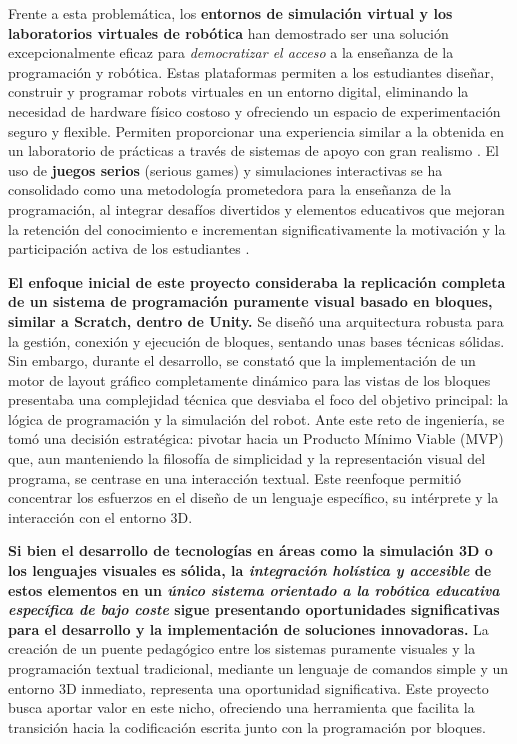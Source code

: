 Frente a esta problemática, los \textbf{entornos de simulación virtual y los laboratorios virtuales de robótica} han demostrado ser una solución excepcionalmente eficaz para \textit{democratizar el acceso} a la enseñanza de la programación y robótica. Estas plataformas permiten a los estudiantes diseñar, construir y programar robots virtuales en un entorno digital, eliminando la necesidad de hardware físico costoso y ofreciendo un espacio de experimentación seguro y flexible. Permiten proporcionar una experiencia similar a la obtenida en un laboratorio de prácticas a través de sistemas de apoyo con gran realismo \cite{Simulador3DUnity}. El uso de \textbf{juegos serios} (serious games) y simulaciones interactivas se ha consolidado como una metodología prometedora para la enseñanza de la programación, al integrar desafíos divertidos y elementos educativos que mejoran la retención del conocimiento e incrementan significativamente la motivación y la participación activa de los estudiantes \cite{GeoBotsVR}.

 \textbf{El enfoque inicial de este proyecto consideraba la replicación completa de un sistema de programación puramente visual basado en bloques, similar a Scratch, dentro de Unity.} Se diseñó una arquitectura robusta para la gestión, conexión y ejecución de bloques, sentando unas bases técnicas sólidas. Sin embargo, durante el desarrollo, se constató que la implementación de un motor de layout gráfico completamente dinámico para las vistas de los bloques presentaba una complejidad técnica que desviaba el foco del objetivo principal: la lógica de programación y la simulación del robot. Ante este reto de ingeniería, se tomó una decisión estratégica: pivotar hacia un Producto Mínimo Viable (MVP) que, aun manteniendo la filosofía de simplicidad y la representación visual del programa, se centrase en una interacción textual. Este reenfoque permitió concentrar los esfuerzos en el diseño de un lenguaje específico, su intérprete y la interacción con el entorno 3D.



\textbf{Si bien el desarrollo de tecnologías en áreas como la simulación 3D o los lenguajes visuales es sólida, la \textit{integración holística y accesible} de estos elementos en un \textit{único sistema orientado a la robótica educativa específica de bajo coste} sigue presentando oportunidades significativas para el desarrollo y la implementación de soluciones innovadoras.}  La creación de un puente pedagógico entre los sistemas puramente visuales y la programación textual tradicional, mediante un lenguaje de comandos simple y un entorno 3D inmediato, representa una oportunidad significativa. Este proyecto busca aportar valor en este nicho, ofreciendo una herramienta que facilita la transición hacia la codificación escrita junto con la programación por bloques.


